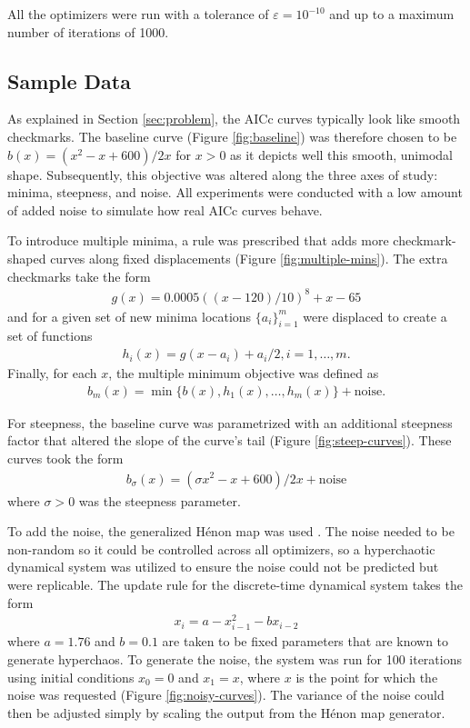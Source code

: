 \documentclass[letterpaper,12pt,twocolumn]{article}
\begin{document}
All the optimizers were run with a tolerance of $\varepsilon = 10^{-10}$ and up to a maximum number of iterations of 1000.

\subsection{Sample Data}
As explained in Section \ref{sec:problem}, the AICc curves typically look like smooth checkmarks. The baseline curve (Figure \ref{fig:baseline}) was therefore chosen to be $b(x) = (x^2 - x + 600)/2x$ for $x > 0$ as it depicts well this smooth, unimodal shape. Subsequently, this objective was altered along the three axes of study: minima, steepness, and noise. All experiments were conducted with a low amount of added noise to simulate how real AICc curves behave.

To introduce multiple minima, a rule was prescribed that adds more checkmark-shaped curves along fixed displacements (Figure \ref{fig:multiple-mins}). The extra checkmarks take the form \begin{align*}
    g(x) = 0.0005((x-120)/10)^8 + x - 65
\end{align*} and for a given set of new minima locations $\{a_i\}_{i=1}^m$ were displaced to create a set of functions \begin{align*}
    h_i(x) = g(x - a_i) + a_i/2, i = 1, \dots, m.
\end{align*} Finally, for each $x$, the multiple minimum objective was defined as \begin{align*}
    b_m(x) = \min \{b(x), h_1(x), \dots, h_m(x)\} + \text{noise}.
\end{align*} 

For steepness, the baseline curve was parametrized with an additional steepness factor that altered the slope of the curve's tail (Figure \ref{fig:steep-curves}). These curves took the form \begin{align*}
    b_\sigma(x) = (\sigma x^2 - x + 600)/2x + \text{noise}
\end{align*} where $\sigma > 0$ was the steepness parameter.

To add the noise, the generalized Hénon map was used \cite{Henon1976}. The noise needed to be non-random so it could be controlled across all optimizers, so a hyperchaotic dynamical system was utilized to ensure the noise could not be predicted but were replicable. The update rule for the discrete-time dynamical system takes the form \begin{align*}
    x_i = a - x_{i-1}^2 - bx_{i-2}
\end{align*} where $a = 1.76$ and $b = 0.1$ are taken to be fixed parameters that are known to generate hyperchaos. To generate the noise, the system was run for 100 iterations using initial conditions $x_0 = 0$ and $x_1 = x$, where $x$ is the point for which the noise was requested (Figure \ref{fig:noisy-curves}). The variance of the noise could then be adjusted simply by scaling the output from the Hénon map generator.
\end{document}
